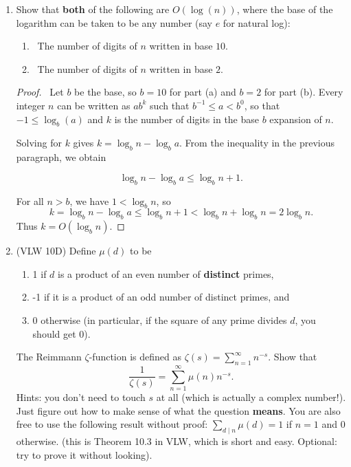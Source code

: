 \documentclass[12pt]{article}
\begin{document}
\begin{enumerate}[leftmargin=0cm,itemindent=.5cm,labelwidth=\itemindent,labelsep=0cm,align=left]
\begin{proof}
\end{proof}

\item Show that \textbf{both} of the following are $O(\log(n))$, where the base of the logarithm can be taken to be any number (say $e$ for natural log):
\begin{enumerate}
\item \ The number of digits of $n$ written in base $10$.
\item \ The number of digits of $n$ written in base $2$.
\end{enumerate}

\begin{proof}

\ Let $b$ be the base, so $b=10$ for part (a) and $b = 2$ for part (b).  Every integer $n$ can be written as $a b^{k}$ such that $b^{-1} \leq a < b^0$, so that $-1 \leq \log_b(a)$ and $k$ is the number of digits in the base $b$ expansion of $n$.

Solving for $k$ gives $k = \log_b n - \log_b a$.  From the inequality in the previous paragraph, we obtain

$$\log_b n - \log_b a \leq \log_b n + 1.$$

For all $n > b$, we have $1 < \log_b n$, so
$$k = \log_b n - \log_b a \leq \log_b n + 1 < \log_b n + \log_b n = 2\log_b n.$$  Thus $k = O(\log_b n)$.
\end{proof}

\item (VLW 10D) Define $\mu(d)$ to be
\begin{enumerate}
\item 1 if $d$ is a product of an even number of \textbf{distinct} primes,
\item -1 if it is a product of an odd number of distinct primes, and
\item 0 otherwise (in particular, if the square of any prime divides $d$, you should get 0).
\end{enumerate}

The Reimmann $\zeta$-function is defined as $\zeta (s) = \sum_{n=1}^\infty n^{-s}$.  Show that
$$\dfrac{1}{\zeta (s)} = \sum_{n=1}^\infty \mu (n) n^{-s}.$$
Hints: you don't need to touch $s$ at all (which is actually a complex number!).  Just figure out how to make sense of what the question \textbf{means}.  You are also free to use the following result without proof: $\sum_{d \mid n} \mu (d) = 1$ if $n = 1$ and $0$ otherwise.  (this is Theorem 10.3 in VLW, which is short and easy.  Optional: try to prove it without looking).


\end{enumerate}
\end{document}
